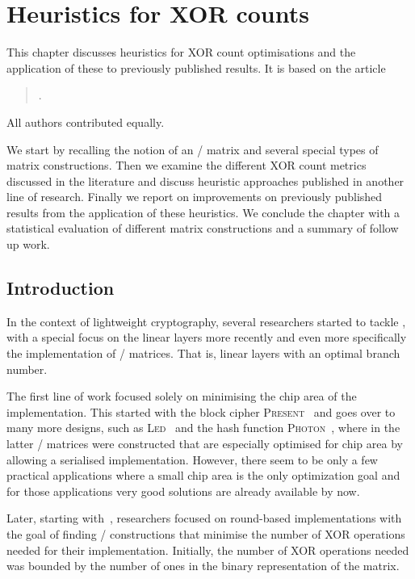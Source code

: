 \chapter{Heuristics for XOR counts}\label{ch:slp}

\vspace*{-\baselineskip}
\hspace{1.5em}
This chapter discusses heuristics for XOR count optimisations and the application of these to previously published results.
It is based on the article
\begin{quote}
    .
\end{quote}
All authors contributed equally.

We start by recalling the notion of an \MDSs/ matrix and several special types of matrix constructions.
Then we examine the different XOR count metrics discussed in the literature and discuss heuristic approaches published in another line of research.
Finally we report on improvements on previously published results from the application of these heuristics.
We conclude the chapter with a statistical evaluation of different matrix constructions and a summary of follow up work.

\section{Introduction}
In the context of lightweight cryptography, several researchers started to tackle , with a special focus on the linear layers more recently and even more specifically the implementation of \MDS/ matrices.
That is, linear layers with an optimal branch number.

The first line of work focused solely on minimising the chip area of the implementation.
This started with the block cipher \textsc{Present}~\cite{CHES:BKLPPR07} and goes over to many more designs, such as \textsc{Led}~\cite{CHES:GPPR11} and the hash function \textsc{Photon}~\cite{C:GuoPeyPos11}, where in the latter \MDS/ matrices were constructed that are especially optimised for chip area by allowing a serialised implementation.
However, there seem to be only a few practical applications where a small chip area is the only optimization goal and for those applications very good solutions are already available by now.

Later, starting with~\cite{CHES:KPPY14}, researchers focused on round-based implementations with the goal of finding \MDS/ constructions that minimise the number of XOR operations needed for their implementation.
Initially, the number of XOR operations needed was bounded by the number of ones in the binary representation of the matrix.

